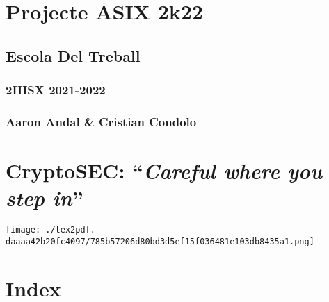 \documentclass[]{article}
\date{}
\begin{document}
\hypertarget{projecte-asix-2k22}{%
\section{\texorpdfstring{\textbf{Projecte ASIX
2k22}}{Projecte ASIX 2k22}}\label{projecte-asix-2k22}}

\hypertarget{escola-del-treball}{%
\subsection{\texorpdfstring{\textbf{Escola Del
Treball}}{Escola Del Treball}}\label{escola-del-treball}}

\hypertarget{hisx-2021-2022}{%
\subsubsection{\texorpdfstring{\textbf{2HISX
2021-2022}}{2HISX 2021-2022}}\label{hisx-2021-2022}}

\hypertarget{aaron-andal-cristian-condolo}{%
\subsubsection{\texorpdfstring{\textbf{Aaron Andal \& Cristian
Condolo}}{Aaron Andal \& Cristian Condolo}}\label{aaron-andal-cristian-condolo}}

\hypertarget{cryptosec-careful-where-you-step-in}{%
\section{\texorpdfstring{\textbf{CryptoSEC}: ``\emph{Careful where you
step
in}''}{CryptoSEC: ``Careful where you step in''}}\label{cryptosec-careful-where-you-step-in}}

\texttt{[image: ./tex2pdf.-daaaa42b20fc4097/785b57206d80bd3d5ef15f036481e103db8435a1.png]}

\hypertarget{index}{%
\section{\texorpdfstring{\textbf{Index}}{Index}}\label{index}}
\end{document}
